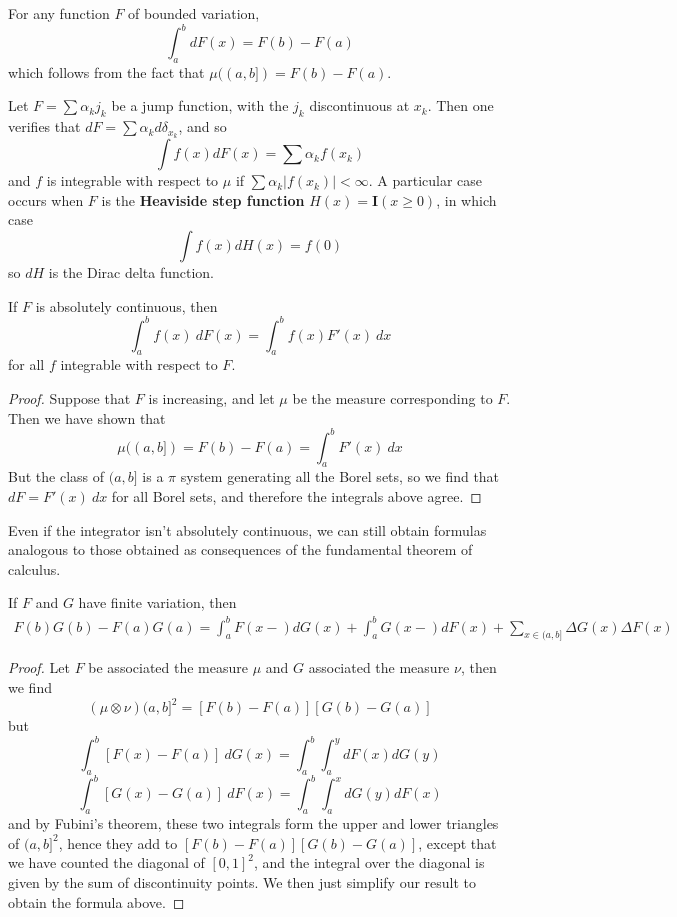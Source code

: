 \begin{example}
    For any function $F$ of bounded variation,
    \[ \int_a^b dF(x) = F(b) - F(a) \]
    which follows from the fact that $\mu((a,b]) = F(b) - F(a)$.
\end{example}

\begin{example}
    Let $F = \sum \alpha_k j_k$ be a jump function, with the $j_k$ discontinuous at $x_k$. Then one verifies that $dF = \sum \alpha_k d \delta_{x_k}$, and so
    \[ \int f(x) dF(x) = \sum \alpha_k f(x_k) \]
    and $f$ is integrable with respect to $\mu$ if $\sum \alpha_k |f(x_k)| < \infty$. A particular case occurs when $F$ is the {\bf Heaviside step function} $H(x) = \mathbf{I}(x \geq 0)$, in which case
    \[ \int f(x) dH(x) = f(0) \]
    so $dH$ is the Dirac delta function.
\end{example}

\begin{theorem}
    If $F$ is absolutely continuous, then
    \[ \int_a^b f(x)\ dF(x) = \int_a^b f(x) F'(x)\ dx \]
    for all $f$ integrable with respect to $F$.
\end{theorem}
\begin{proof}
    Suppose that $F$ is increasing, and let $\mu$ be the measure corresponding to $F$. Then we have shown that
    \[ \mu((a,b]) = F(b) - F(a) = \int_a^b F'(x)\ dx \]
    But the class of $(a,b]$ is a $\pi$ system generating all the Borel sets, so we find that $dF = F'(x)\ dx$ for all Borel sets, and therefore the integrals above agree.
\end{proof}

Even if the integrator isn't absolutely continuous, we can still obtain formulas analogous to those obtained as consequences of the fundamental theorem of calculus.

\begin{theorem}
    If $F$ and $G$ have finite variation, then
    \begin{align*}
        F(b)G(b) - F(a)G(a) = \int_a^b F(x-) dG(x) + \int_a^b G(x-) dF(x) + \sum_{x \in (a,b]} \Delta G(x) \Delta F(x)
    \end{align*}
\end{theorem}
\begin{proof}
    Let $F$ be associated the measure $\mu$ and $G$ associated the measure $\nu$, then we find
    \[ (\mu \otimes \nu)(a,b]^2 = [F(b) - F(a)][G(b) - G(a)] \]
    but
    \[ \int_{a}^b [F(x) - F(a)]\ dG(x) = \int_{a}^b \int_{a}^y dF(x) dG(y) \]
    \[ \int_{a}^b [G(x) - G(a)]\ dF(x) = \int_{a}^b \int_{a}^x dG(y) dF(x) \]
    and by Fubini's theorem, these two integrals form the upper and lower triangles of $(a,b]^2$, hence they add to $[F(b) - F(a)][G(b) - G(a)]$, except that we have counted the diagonal of $[0,1]^2$, and the integral over the diagonal is given by the sum of discontinuity points. We then just simplify our result to obtain the formula above.
\end{proof}

